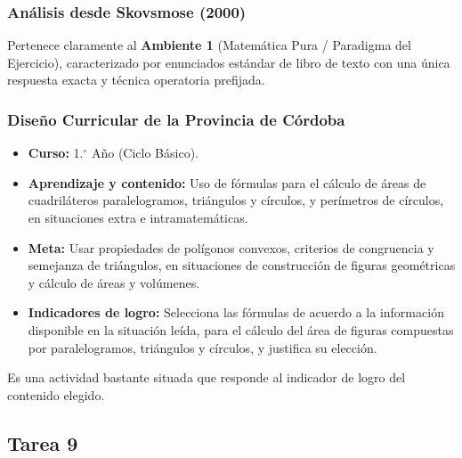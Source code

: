 \documentclass[11pt,a4paper]{article}
\begin{document}
\subsubsection{Análisis desde Skovsmose (2000)}
Pertenece claramente al \textbf{Ambiente 1} (Matemática Pura / Paradigma del Ejercicio), caracterizado por enunciados estándar de libro de texto con una única respuesta exacta y técnica operatoria prefijada.

\subsubsection{Diseño Curricular de la Provincia de Córdoba}
\begin{itemize}
    \item \textbf{Curso:} 1.$^{\circ}$ Año (Ciclo Básico).
    \item \textbf{Aprendizaje y contenido:} Uso de fórmulas para el cálculo de áreas de cuadriláteros paralelogramos, triángulos y círculos, y perímetros de círculos, en situaciones extra e intramatemáticas.
    \item \textbf{Meta:} Usar propiedades de polígonos convexos, criterios de congruencia y semejanza de triángulos, en situaciones de construcción de figuras geométricas y cálculo de áreas y volúmenes.
    \item \textbf{Indicadores de logro:} Selecciona las fórmulas de acuerdo a la información disponible en la situación leída, para el cálculo del área de figuras compuestas por paralelogramos, triángulos y círculos, y justifica su elección.
\end{itemize}
Es una actividad bastante situada que responde al indicador de logro del contenido elegido.
\subsection{Tarea 9}
\end{document}
